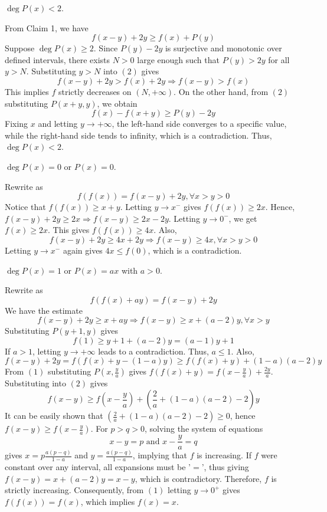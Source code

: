 \documentclass[11pt]{scrartcl}
\begin{document}
\begin{itemize}[label=, leftmargin=0em, itemsep=0.2em]
\begin{sol}
 $\deg P(x) < 2$.
\begin{pro}
    From Claim 1, we have
    \[
        f(x - y) + 2y \geq f(x) + P(y) \tag{2}
    \]
    Suppose $\deg P(x) \geq 2$. Since $P(y) - 2y$ is surjective and monotonic over defined intervals, there exists $N > 0$ large enough such that $P(y) > 2y$ for all $y > N$. Substituting $y > N$ into $(2)$ gives
    \[
        f(x - y) + 2y > f(x) + 2y \Rightarrow f(x - y) > f(x)
    \]
    This implies $f$ strictly decreases on $(N, +\infty)$. On the other hand, from $(2)$ substituting $P(x + y, y)$, we obtain
    \[
        f(x) - f(x + y) \geq P(y) - 2y
    \]
    Fixing $x$ and letting $y \to +\infty$, the left-hand side converges to a specific value, while the right-hand side tends to infinity, which is a contradiction. Thus, $\deg P(x) < 2$.
\end{pro}

 $\deg P(x) = 0$ or $P(x) = 0$.
\begin{pro}
    Rewrite as
    \[
        f(f(x)) = f(x - y) + 2y, \forall x > y > 0 \tag{1}
    \]
    Notice that $f(f(x)) \geq x + y$. Letting $y \to x^-$ gives $f(f(x)) \geq 2x$. Hence, $f(x - y) + 2y \geq 2x \Rightarrow f(x - y) \geq 2x - 2y$. Letting $y \to 0^-$, we get $f(x) \geq 2x$. This gives $f(f(x)) \geq 4x$. Also,
    \[
        f(x - y) + 2y \geq 4x + 2y \Rightarrow f(x - y) \geq 4x, \forall x > y > 0
    \]
    Letting $y \to x^-$ again gives $4x \leq f(0)$, which is a contradiction.
\end{pro}

 $\deg P(x) = 1$ or $P(x) = ax$ with $a > 0$.

    Rewrite as
    \[
        f(f(x) + ay) = f(x - y) + 2y \tag{1}
    \]
    We have the estimate
    \[
        f(x - y) + 2y \geq x + ay \Rightarrow f(x - y) \geq x + (a - 2)y, \forall x > y
    \]
    Substituting $P(y + 1, y)$ gives
    \[
        f(1) \geq y + 1 + (a - 2)y = (a - 1)y + 1
    \]
    If $a > 1$, letting $y \to +\infty$ leads to a contradiction. Thus, $a \leq 1$. Also,
    \[
        f(x - y) + 2y = f(f(x) + y - (1 - a)y) \geq f(f(x) + y) + (1 - a)(a - 2)y \tag{2}
    \]
    From $(1)$ substituting $P\left(x, \frac{y}{a}\right)$ gives $f(f(x) + y) = f\left(x - \frac{y}{a}\right) + \frac{2y}{a}$. Substituting into $(2)$ gives
    \[
        f(x - y) \geq f\left(x - \frac{y}{a}\right) + \left(\frac{2}{a} + (1 - a)(a - 2) - 2\right)y
    \]
    It can be easily shown that $\left(\frac{2}{a} + (1 - a)(a - 2) - 2\right) \geq 0$, hence $f(x - y) \geq f\left(x - \frac{y}{a}\right)$. For $p > q > 0$, solving the system of equations
    \[
        x - y = p \text{ and } x - \frac{y}{a} = q
    \]
    gives $x = p \frac{a(p - q)}{1 - a}$ and $y = \frac{a(p - q)}{1 - a}$, implying that $f$ is increasing. If $f$ were constant over any interval, all expansions must be '$=$', thus giving $f(x - y) = x + (a - 2)y = x - y$, which is contradictory. Therefore, $f$ is strictly increasing. Consequently, from $(1)$ letting $y \to 0^+$ gives $f(f(x)) = f(x)$, which implies $\boxed{f(x) = x}$.
\end{sol}





\end{itemize}
\end{document}
